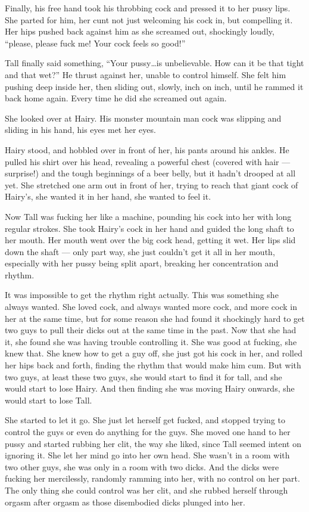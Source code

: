 \documentclass[letterpaper]{article}
\begin{document}
\begin{multicols}{2}
Finally, his free hand took his throbbing cock and pressed it to her pussy lips.
She parted for him, her cunt not just welcoming his cock in, but compelling it.
Her hips pushed back against him as she screamed out, shockingly loudly, ``please, please fuck me! Your cock feels so good!''

Tall finally said something, ``Your pussy\ldots is unbelievable. How can it be that tight and that wet?''
He thrust against her, unable to control himself.
She felt him pushing deep inside her, then sliding out, slowly, inch on inch, until he rammed it back home again.
Every time he did she screamed out again.

She looked over at Hairy.
His monster mountain man cock was slipping and sliding in his hand, his eyes met her eyes.

Hairy stood, and hobbled over in front of her, his pants around his ankles.
He pulled his shirt over his head, revealing a powerful chest (covered with hair --- surprise!) and the tough beginnings of a beer belly, but it hadn't drooped at all yet.
She stretched one arm out in front of her, trying to reach that giant cock of Hairy's, she wanted it in her hand, she wanted to feel it.

Now Tall was fucking her like a machine, pounding his cock into her with long regular strokes.
She took Hairy's cock in her hand and guided the long shaft to her mouth.
Her mouth went over the big cock head, getting it wet.
Her lips slid down the shaft --- only part way, she just couldn't get it all in her mouth, especially with her pussy being split apart, breaking her concentration and rhythm.

It was impossible to get the rhythm right actually.
This was something she always wanted. 
She loved cock, and always wanted more cock, and more cock in her at the same time, but for some reason she had found it shockingly hard to get two guys to pull their dicks out at the same time in the past.
Now that she had it, she found she was having trouble controlling it.
She was good at fucking, she knew that.
She knew how to get a guy off, she just got his cock in her, and rolled her hips back and forth, finding the rhythm that would make him cum.
But with two guys, at least these two guys, she would start to find it for tall, and she would start to lose Hairy.
And then finding she was moving Hairy onwards, she would start to lose Tall.

She started to let it go. She just let herself get fucked, and stopped trying to control the guys or even do anything for the guys.
She moved one hand to her pussy and started rubbing her clit, the way she liked, since Tall seemed intent on ignoring it.
She let her mind go into her own head.
She wasn't in a room with two other guys, she was only in a room with two dicks.
And the dicks were fucking her mercilessly, randomly ramming into her, with no control on her part.
The only thing she could control was her clit, and she rubbed herself through orgasm after orgasm as those disembodied dicks plunged into her.


\end{multicols}
\end{document}
